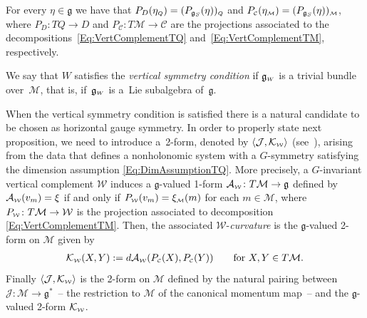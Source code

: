 \documentclass[10pt,a4paper]{amsart}
\numberwithin{equation}{section}
\def\W{\mathcal{W}}
\def\M{\mathcal{M}}
\def\J{\mathcal{J}}
\def\C{\mathcal{C}}
\def\g{\mathfrak{g}}
\def\subW{{\mbox{\tiny{$\W$}}}}
\def\subC{{\mbox{\tiny{$\C$}}}}
\def\subM{{\mbox{\tiny{$\M$}}}}
\def\subWW{{\mbox{\tiny{$W$}}}}
\begin{document}
\begin{Remark} \label{R:Proj} For every $\eta\in \mathfrak{g}$ we have that $P_{D}(\eta_{\mbox{\tiny{$Q$}}}) = ( P_{\mathfrak{g}_S}(\eta))_{\mbox{\tiny{$Q$}}}$ and  $P_{\subC} (\eta_\subM) = ( P_{\mathfrak{g}_S}(\eta)  )_\subM$,
 where $P_D \colon TQ \to D$ and $P_\C \colon T\M\to \C$ are the projections associated
 to the decompositions~\eqref{Eq:VertComplementTQ} and~\eqref{Eq:VertComplementTM},
 respectively.
\end{Remark}

 \begin{Definition} \label{D:VertSym}
We say that $W$ satisf\/ies the
{\it vertical symmetry condition} if $\mathfrak{g}_\subWW$ is a trivial bundle over~$\M$,
that is, if~$\mathfrak{g}_\subWW$ is a~Lie subalgebra of~$\mathfrak{g}$.
\end{Definition}

When the vertical symmetry condition is satisf\/ied there is a natural candidate
to be chosen as horizontal gauge symmetry. In order to properly state next proposition,
we need to introduce a~2-form, denoted by
$\langle \mathcal{J}, \mathcal{K}_\subW \rangle$ (see~\cite{Paula}),
arising from the data that def\/ines a nonholonomic system with a
$G$-symmetry satisfying the dimension assumption \eqref{Eq:DimAssumptionTQ}.
More precisely, a $G$-invariant vertical complement $\W$ induces a $\g$-valued
1-form ${\mathcal A}_\subW\colon  T\M \to \mathfrak{g}$ def\/ined by
${\mathcal A}_\subW (v_m) = \xi$ if and only if $P_\subW (v_m) = \xi_\subM(m)$
for each $m\in\M$, where $P_\subW \colon T\M \to \W$ is the projection associated to decomposition \eqref{Eq:VertComplementTM}. Then, the associated $\W$-{\it curvature} is the $\mathfrak{g}$-valued
2-form on $\M$ given by
\begin{gather*} %
\mathcal{K}_\subW(X,Y):=  d {\mathcal A}_\subW(P_\subC (X),P_\subC (Y)) \qquad \mbox{for} \ X,Y \in T\M.
\end{gather*}
Finally $\langle \mathcal{J}, \mathcal{K}_\subW \rangle$ is the 2-form on $\M$
def\/ined by the natural pairing between $\J \colon \M\to \g^*$~-- the restriction to $\M$ of the canonical momentum map~--
and the $\mathfrak{g}$-valued 2-form $\mathcal{K}_\subW$.
\end{document}
